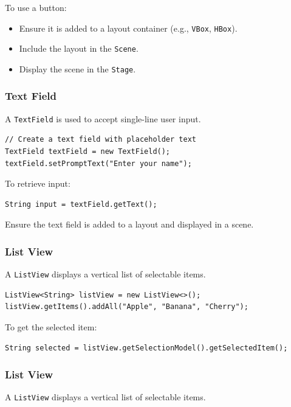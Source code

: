 \documentclass{article}
\newcommand{\codecmd}[1]{\textcolor[rgb]{0,0.5,0}{\texttt{#1}}}
\begin{document}
To use a button:
\begin{itemize}
    \item Ensure it is added to a layout container (e.g., \codecmd{VBox}, \codecmd{HBox}).
    \item Include the layout in the \codecmd{Scene}.
    \item Display the scene in the \codecmd{Stage}.
\end{itemize}

\subsubsection{Text Field}

A \codecmd{TextField} is used to accept single-line user input.

\begin{verbatim}
// Create a text field with placeholder text
TextField textField = new TextField();
textField.setPromptText("Enter your name");
\end{verbatim}

\noindent To retrieve input:
\begin{verbatim}
String input = textField.getText();
\end{verbatim}

Ensure the text field is added to a layout and displayed in a scene.

\subsubsection{List View}

A \codecmd{ListView} displays a vertical list of selectable items.

\begin{verbatim}
ListView<String> listView = new ListView<>();
listView.getItems().addAll("Apple", "Banana", "Cherry");
\end{verbatim}

\noindent To get the selected item:
\begin{verbatim}
String selected = listView.getSelectionModel().getSelectedItem();
\end{verbatim}

\subsubsection{List View}

A \codecmd{ListView} displays a vertical list of selectable items.
\end{document}
